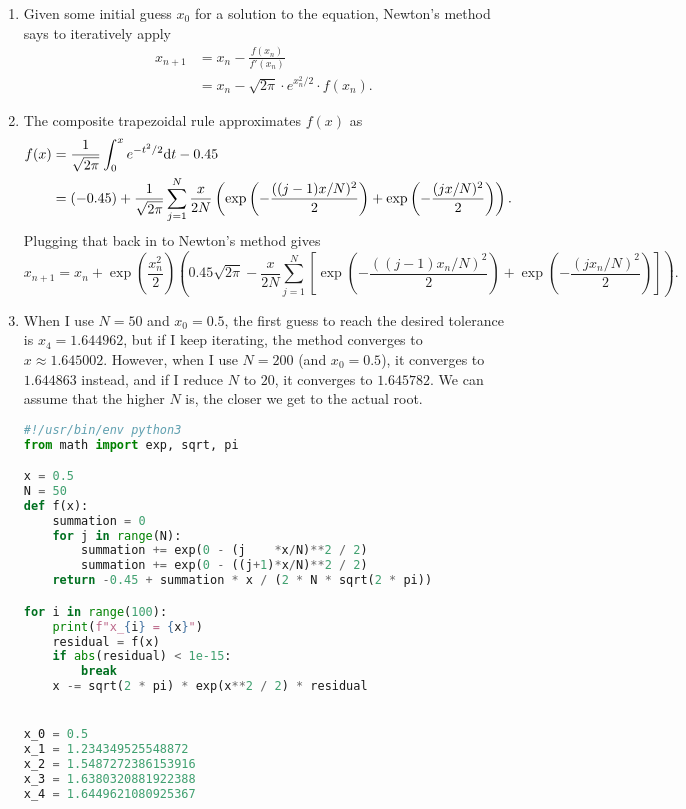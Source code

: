 \documentclass{article}
\begin{document}
\bigskip
\begin{prob}
\end{prob}
\begin{enumerate}[label=(\alph*)]
    \item Given some initial guess $x_0$ for a solution to the equation, Newton's method says to iteratively apply \begin{align*}
            x_{n+1} &= x_n - \frac{f(x_n)}{f'(x_n)} \\
                    &= x_n - \sqrt{2\pi} \cdot e^{x_n^2/2} \cdot f(x_n).
    \end{align*}
\item The composite trapezoidal rule approximates $f(x)$ as \begin{align*}
        f(x) &= \frac{1}{\sqrt{2\pi}} \int_0^x e^{-t^2/2} \mathrm{d} t - 0.45 \\
             &= (-0.45) + \frac{1}{\sqrt{2\pi}} \sum_{j=1}^N \frac{x}{2N} \left( \exp \left( - \frac{((j-1)x/N)^2}{2} \right) + \exp \left( - \frac{(jx/N)^2}{2} \right) \right).
\end{align*}
Plugging that back in to Newton's method gives
\[ x_{n+1} = x_n + \exp\left( \frac{x_n^2}{2} \right) \left( 0.45 \sqrt{2\pi} - \frac{x}{2N} \sum_{j=1}^N \left[ \exp \left( - \frac{((j-1)x_n/N)^2}{2} \right) + \exp \left( - \frac{(jx_n/N)^2}{2} \right) \right] \right). \]

    \item When I use $N=50$ and $x_0=0.5$, the first guess to reach the desired tolerance is $x_4 = 1.644962$, but if I keep iterating, the method converges to $x\approx1.645002$. However, when I use $N=200$ (and $x_0=0.5$), it converges to $1.644863$ instead, and if I reduce $N$ to $20$, it converges to $1.645782$. We can assume that the higher $N$ is, the closer we get to the actual root.
        \begin{lstlisting}[language=Python]
#!/usr/bin/env python3
from math import exp, sqrt, pi

x = 0.5
N = 50
def f(x):
    summation = 0
    for j in range(N):
        summation += exp(0 - (j    *x/N)**2 / 2)
        summation += exp(0 - ((j+1)*x/N)**2 / 2)
    return -0.45 + summation * x / (2 * N * sqrt(2 * pi))

for i in range(100):
    print(f"x_{i} = {x}")
    residual = f(x)
    if abs(residual) < 1e-15:
        break
    x -= sqrt(2 * pi) * exp(x**2 / 2) * residual


x_0 = 0.5
x_1 = 1.234349525548872
x_2 = 1.5487272386153916
x_3 = 1.6380320881922388
x_4 = 1.6449621080925367
        \end{lstlisting}
\end{enumerate}


\end{document}

